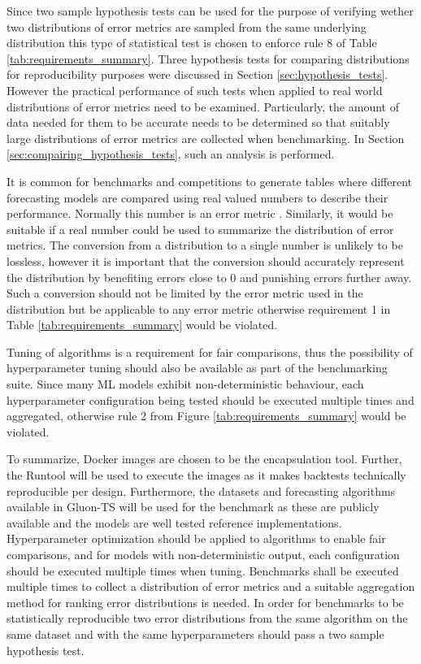 Since two sample hypothesis tests can be used for the purpose of verifying wether two distributions of error metrics are sampled from the same underlying distribution this type of statistical test is chosen to enforce rule 8 of Table \ref{tab:requirements_summary}. Three hypothesis tests for comparing distributions for reproducibility purposes were discussed in Section \ref{sec:hypothesis_tests}. However the practical performance of such tests when applied to real world distributions of error metrics need to be examined. Particularly, the amount of data needed for them to be accurate needs to be determined so that suitably large distributions of error metrics are collected when benchmarking. In Section \ref{sec:compairing_hypothesis_tests}, such an analysis is performed.

It is common for benchmarks and competitions to generate tables where different forecasting models are compared using real valued numbers to describe their performance. Normally this number is an error metric \cite{m3_competition,makridakis_m4_2020,m5,hyndman_forecasting_3rd,salinas_deepar_2019,oreshkin_n_beats_2020}. Similarly, it would be suitable if a real number could be used to summarize the distribution of error metrics. The conversion from a distribution to a single number is unlikely to be lossless, however it is important that the conversion should accurately represent the distribution by benefiting errors close to 0 and punishing errors further away. Such a conversion should not be limited by the error metric used in the distribution but be applicable to any error metric otherwise requirement 1 in Table \ref{tab:requirements_summary} would be violated.

Tuning of algorithms is a requirement for fair comparisons, thus the possibility of hyperparameter tuning should also be available as part of the benchmarking suite. Since many ML models exhibit non-deterministic behaviour, each hyperparameter configuration being tested should be executed multiple times and aggregated, otherwise rule 2 from Figure \ref{tab:requirements_summary} would be violated.

To summarize, Docker images are chosen to be the encapsulation tool. Further, the Runtool will be used to execute the images as it makes backtests technically reproducible per design. Furthermore, the datasets and forecasting algorithms available in Gluon-TS will be used for the benchmark as these are publicly available and the models are well tested reference implementations. Hyperparameter optimization should be applied to algorithms to enable fair comparisons, and for models with non-deterministic output, each configuration should be executed multiple times when tuning. Benchmarks shall be executed multiple times to collect a distribution of error metrics and a suitable aggregation method for ranking error distributions is needed. In order for benchmarks to be statistically reproducible two error distributions from the same algorithm on the same dataset and with the same hyperparameters should pass a two sample hypothesis test.

